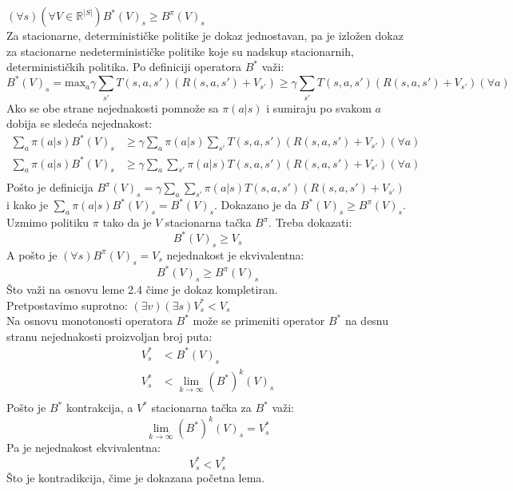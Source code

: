 \documentclass[a4paper,fleqn,12pt]{JMThesis}
\theoremstyle{plain}
\theoremstyle{definition}
\theoremstyle{definition}
\begin{document}
\lem $(\forall s) (\forall V \in \mathbb{R}^{|S|}) B^*(V)_s \geq B^{\pi}(V)_s$ \\
Za stacionarne, determinističke politike je dokaz jednostavan, pa je izložen dokaz za stacionarne nedeterminističke politike
koje su nadskup stacionarnih, determinističkih politika.
Po definiciji operatora $B^*$ važi:
\[
	B^*(V)_s = \text{max}_a \gamma \sum_{s'}T(s,a,s')(R(s,a,s')+V_{s'}) \geq \gamma \sum_{s'}T(s,a,s')(R(s,a,s')+V_{s'}) (\forall a) 
\]
Ako se obe strane nejednakosti pomnože sa $\pi(a|s)$ i sumiraju po svakom $a$ dobija se sledeća nejednakost:
\[
	\begin{split}
		\sum_{a} \pi(a|s) B^*(V)_s &\geq \gamma \sum_{a} \pi(a|s) \sum_{s'}T(s,a,s')(R(s,a,s')+V_{s'}) (\forall a)\\
		\sum_{a} \pi(a|s) B^*(V)_s &\geq \gamma \sum_{a} \sum_{s'}\pi(a|s) T(s,a,s')(R(s,a,s')+V_{s'}) (\forall a)\\
	\end{split}
\]
Pošto je definicija $B^{\pi}(V)_s = \gamma \sum_{a} \sum_{s'}\pi(a|s) T(s,a,s')(R(s,a,s')+V_{s'})$ i kako je $\sum_{a} \pi(a|s) B^*(V)_s = B^*(V)_s$.
Dokazano je da $B^*(V)_s \geq B^{\pi}(V)_s$.
\\
Uzmimo politiku $\pi$ tako da je $V$ stacionarna tačka $B^{\pi}$.
Treba dokazati:
\[ B^*(V)_s \geq V_s \]
A pošto je $(\forall s) B^{\pi}(V)_s = V_s$ nejednakost je ekvivalentna:
\[ B^*(V)_s \geq B^{\pi}(V)_s \]
Što važi na osnovu leme 2.4 čime je dokaz kompletiran.
\\
Pretpostavimo suprotno: $(\exists v)(\exists s) V^*_s < V_s$\\
Na osnovu monotonosti operatora $B^*$ može se primeniti operator $B^*$ na desnu stranu nejednakosti proizvoljan broj puta:
\[
	\begin{split}
		V^*_s &< B^*(V)_s\\
		V^*_s &< \lim_{k \to \infty}(B^*)^k(V)_s\\
	\end{split}
\]
Pošto je $B^*$ kontrakcija, a $V^*$ stacionarna tačka za $B^*$ važi:
\[ \lim_{k \to \infty}(B^*)^k(V)_s = V^*_s \]
Pa je nejednakost ekvivalentna:
\[ V^*_s < V^*_s \]
Što je kontradikcija, čime je dokazana početna lema.
\end{document}
